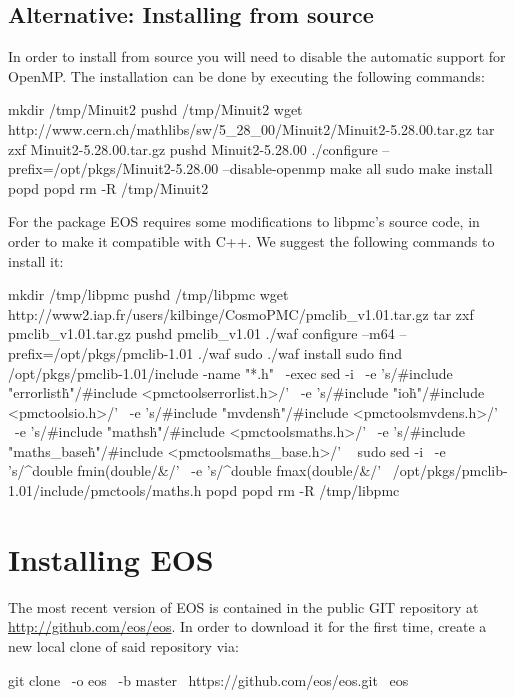 \subsection{Alternative: Installing from source}

In order to install  from source you will need to
disable the automatic support for OpenMP. The installation can be done by
executing the following commands:
\begin{commandline}
mkdir /tmp/Minuit2
pushd /tmp/Minuit2
wget http://www.cern.ch/mathlibs/sw/5_28_00/Minuit2/Minuit2-5.28.00.tar.gz
tar zxf Minuit2-5.28.00.tar.gz
pushd Minuit2-5.28.00
./configure --prefix=/opt/pkgs/Minuit2-5.28.00 --disable-openmp
make all
sudo make install
popd
popd
rm -R /tmp/Minuit2
\end{commandline}

For the  package EOS requires some modifications to libpmc's
source code, in order to make it compatible with C++. We suggest the following
commands to install it:
\begin{commandline}
mkdir /tmp/libpmc
pushd /tmp/libpmc
wget http://www2.iap.fr/users/kilbinge/CosmoPMC/pmclib_v1.01.tar.gz
tar zxf pmclib_v1.01.tar.gz
pushd pmclib_v1.01
./waf configure --m64 --prefix=/opt/pkgs/pmclib-1.01
./waf
sudo ./waf install
sudo find /opt/pkgs/pmclib-1.01/include -name "*.h" \
    -exec sed -i \
    -e 's/#include "errorlist\.h"/#include <pmctools\/errorlist.h>/' \
    -e 's/#include "io\.h"/#include <pmctools\/io.h>/' \
    -e 's/#include "mvdens\.h"/#include <pmctools\/mvdens.h>/' \
    -e 's/#include "maths\.h"/#include <pmctools\/maths.h>/' \
    -e 's/#include "maths_base\.h"/#include <pmctools\/maths_base.h>/' \
    {} \;
sudo sed -i \
    -e 's/^double fmin(double/\/\/&/' \
    -e 's/^double fmax(double/\/\/&/' \
    /opt/pkgs/pmclib-1.01/include/pmctools/maths.h
popd
popd
rm -R /tmp/libpmc
\end{commandline}


\section{Installing EOS}

The most recent version of EOS is contained in the public GIT \cite{GIT}
repository at \url{http://github.com/eos/eos}.  In order to download it for the
first time, create a new local clone of said repository via:
%
\begin{commandline}
git clone \
    -o eos \
    -b master \
    https://github.com/eos/eos.git \
    eos
\end{commandline}


